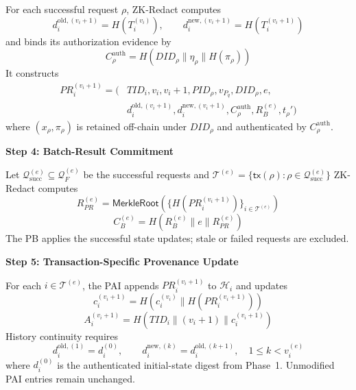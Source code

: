 \documentclass[lettersize,journal]{IEEEtran}
\begin{document}
For each successful request $\rho$, ZK-Redact computes
\begin{equation}
d_i^{\mathrm{old},(v_i+1)}=H(T_i^{(v_i)}),\qquad
d_i^{\mathrm{new},(v_i+1)}=H(T_i^{(v_i+1)})
\label{eq:state-digests}
\end{equation}
and binds its authorization evidence by
\begin{equation}
C_\rho^{\mathrm{auth}}
=
H(DID_\rho\parallel\eta_\rho\parallel H(\pi_\rho))
\label{eq:authorization-evidence}
\end{equation}
It constructs
\begin{equation}
\begin{split}
PR_i^{(v_i+1)}
=\big(&TID_i,v_i,v_i+1,PID_\rho,v_{P_q},DID_\rho,e,\\
&d_i^{\mathrm{old},(v_i+1)},d_i^{\mathrm{new},(v_i+1)},
C_\rho^{\mathrm{auth}},R_B^{(e)},t_\rho'\big)
\end{split}
\label{eq:provenance-record}
\end{equation}
where $(x_\rho,\pi_\rho)$ is retained off-chain under $DID_\rho$ and
authenticated by $C_\rho^{\mathrm{auth}}$.

\noindent\textbf{Step 4: Batch-Result Commitment}

Let $\mathcal{Q}_{\mathrm{succ}}^{(e)}\subseteq\mathcal{Q}_F^{(e)}$
be the successful requests and
$\mathcal{T}^{(e)}
=\{\mathsf{tx}(\rho):\rho\in\mathcal{Q}_{\mathrm{succ}}^{(e)}\}$
ZK-Redact computes
\begin{equation}
R_{PR}^{(e)}
=
\mathsf{MerkleRoot}
\left(
\{H(PR_i^{(v_i+1)})\}_{i\in\mathcal{T}^{(e)}}
\right)
\end{equation}
\begin{equation}
C_B^{(e)}
=
H(R_B^{(e)}\parallel e\parallel R_{PR}^{(e)})
\end{equation}
The PB applies the successful state updates; stale or failed requests
are excluded.

\noindent\textbf{Step 5: Transaction-Specific Provenance Update}

For each $i\in\mathcal{T}^{(e)}$, the PAI appends
$PR_i^{(v_i+1)}$ to $\mathcal{H}_i$ and updates
\begin{equation}
c_i^{(v_i+1)}
=H\!\left(c_i^{(v_i)}\parallel H(PR_i^{(v_i+1)})\right)
\end{equation}
\begin{equation}
A_i^{(v_i+1)}
=H(TID_i\parallel(v_i+1)\parallel c_i^{(v_i+1)})
\label{eq:pai-update}
\end{equation}
History continuity requires
\begin{equation}
d_i^{\mathrm{old},(1)}=d_i^{(0)},\qquad
d_i^{\mathrm{new},(k)}=d_i^{\mathrm{old},(k+1)},
\quad 1\le k<v_i^{(e)}
\label{eq:history-continuity}
\end{equation}
where $d_i^{(0)}$ is the authenticated initial-state digest from
Phase~1. Unmodified PAI entries remain unchanged.
\end{document}
